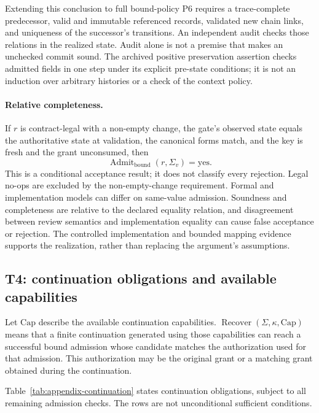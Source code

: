 Extending this conclusion to full bound-policy P6 requires a trace-complete predecessor, valid and immutable referenced records, validated new chain links, and uniqueness of the successor's transitions. An independent audit checks those relations in the realized state. Audit alone is not a premise that makes an unchecked commit sound. The archived positive preservation assertion checks admitted fields in one step under its explicit pre-state conditions; it is not an induction over arbitrary histories or a check of the context policy.

\paragraph{Relative completeness.}
If $r$ is contract-legal with a non-empty change, the gate's observed state equals the authoritative state at validation, the canonical forms match, and the key is fresh and the grant unconsumed, then
\[
 \operatorname{Admit}_{\mathrm{bound}}(r,\Sigma_v)=\mathrm{yes}.
\]
This is a conditional acceptance result; it does not classify every rejection. Legal no-ops are excluded by the non-empty-change requirement. Formal and implementation models can differ on same-value admission. Soundness and completeness are relative to the declared equality relation, and disagreement between review semantics and implementation equality can cause false acceptance or rejection. The controlled implementation and bounded mapping evidence supports the realization, rather than replacing the argument's assumptions.

\subsection{T4: continuation obligations and available capabilities}
\label{app:t4}
Let $\mathrm{Cap}$ describe the available continuation capabilities.
$\operatorname{Recover}(\Sigma,\kappa,\mathrm{Cap})$ means that a finite continuation generated using those capabilities can reach a successful bound admission whose candidate matches the authorization used for that admission. This authorization may be the original grant or a matching grant obtained during the continuation.

Table~\ref{tab:appendix-continuation} states continuation obligations, subject to all remaining admission checks. The rows are not unconditional sufficient conditions.


